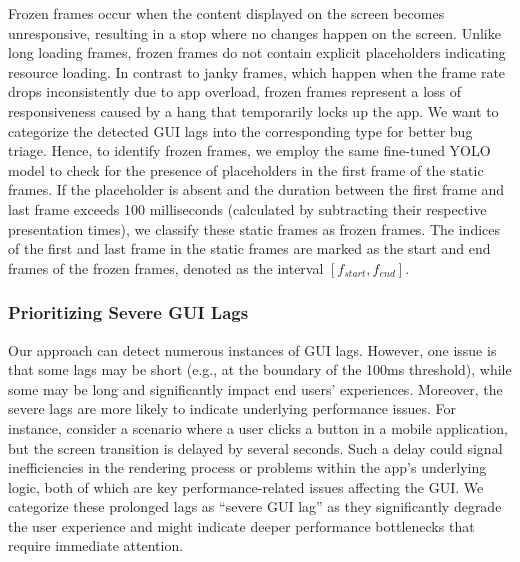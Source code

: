  Frozen frames occur when the content displayed on the screen becomes unresponsive, resulting in a stop where no changes happen on the screen. Unlike long loading frames, frozen frames do not contain explicit placeholders indicating resource loading. In contrast to janky frames, which happen when the frame rate drops inconsistently due to app overload, frozen frames represent a loss of responsiveness caused by a hang that temporarily locks up the app. We want to categorize the detected GUI lags into the corresponding type for better bug triage. Hence, to identify frozen frames, we employ the same fine-tuned YOLO~\cite{yolov} model to check for the presence of placeholders in the first frame of the static frames. If the placeholder is absent and the duration between the first frame and last frame exceeds 100 milliseconds (calculated by subtracting their respective presentation times), we classify these static frames as frozen frames. The indices of the first and last frame in the static frames are marked as the start and end frames of the frozen frames, denoted as the interval $[f_{start}, f_{end}]$. 


\subsubsection{Prioritizing Severe GUI Lags}
Our approach can detect numerous instances of GUI lags. However, one issue is that some lags may be short (e.g., at the boundary of the 100ms threshold), while some may be long and significantly impact end users’ experiences. Moreover, the severe lags are more likely to indicate underlying performance issues.  
For instance, consider a scenario where a user clicks a button in a mobile application, but the screen transition is delayed by several seconds. Such a delay could signal inefficiencies in the rendering process or problems within the app’s underlying logic, both of which are key performance-related issues affecting the GUI. We categorize these prolonged lags as ``severe GUI lag'' as they significantly degrade the user experience and might indicate deeper performance bottlenecks that require immediate attention.






